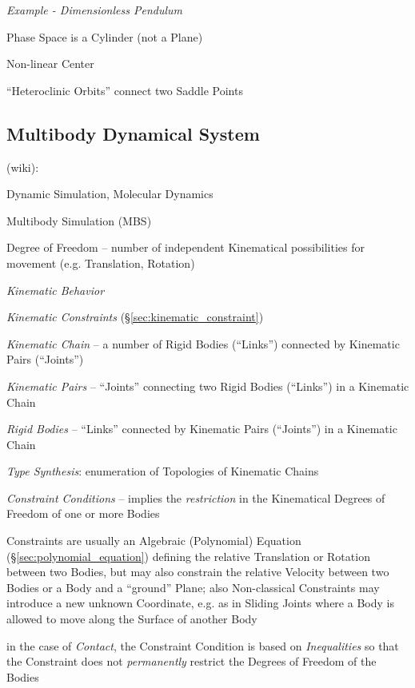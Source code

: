 \emph{Example - Dimensionless Pendulum}

Phase Space is a Cylinder (not a Plane)

Non-linear Center

``Heteroclinic Orbits'' connect two Saddle Points



\subsection{Multibody Dynamical System}\label{sec:multibody_system}

(wiki):

Dynamic Simulation, Molecular Dynamics

Multibody Simulation (MBS)

Degree of Freedom -- number of independent Kinematical possibilities for
movement (e.g. Translation, Rotation)

\emph{Kinematic Behavior}

\emph{Kinematic Constraints} (\S\ref{sec:kinematic_constraint})

\emph{Kinematic Chain} -- a number of Rigid Bodies (``Links'') connected by
Kinematic Pairs (``Joints'')

\emph{Kinematic Pairs} -- ``Joints'' connecting two Rigid Bodies (``Links'') in
a Kinematic Chain

\emph{Rigid Bodies} -- ``Links'' connected by Kinematic Pairs (``Joints'') in a
Kinematic Chain

\emph{Type Synthesis}: enumeration of Topologies of Kinematic Chains

\emph{Constraint Conditions} -- implies the \emph{restriction} in the
Kinematical Degrees of Freedom of one or more Bodies

Constraints are usually an Algebraic (Polynomial) Equation
(\S\ref{sec:polynomial_equation}) defining the relative Translation or Rotation
between two Bodies, but may also constrain the relative Velocity between two
Bodies or a Body and a ``ground'' Plane; also Non-classical Constraints may
introduce a new unknown Coordinate, e.g. as in Sliding Joints where a Body is
allowed to move along the Surface of another Body

in the case of \emph{Contact}, the Constraint Condition is based on
\emph{Inequalities} so that the Constraint does not \emph{permanently} restrict
the Degrees of Freedom of the Bodies

